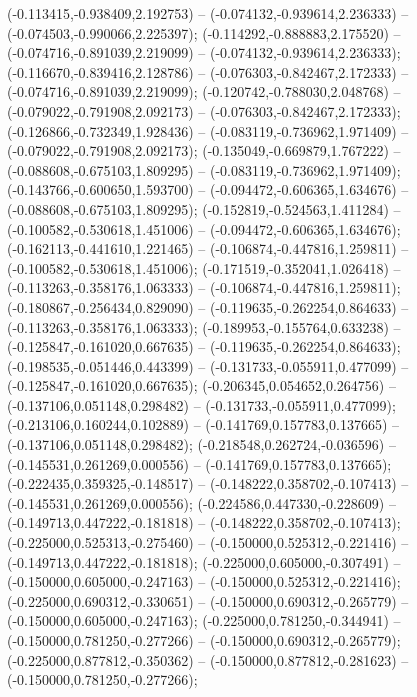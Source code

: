  (-0.113415,-0.938409,2.192753) -- (-0.074132,-0.939614,2.236333) -- (-0.074503,-0.990066,2.225397);
 (-0.114292,-0.888883,2.175520) -- (-0.074716,-0.891039,2.219099) -- (-0.074132,-0.939614,2.236333);
 (-0.116670,-0.839416,2.128786) -- (-0.076303,-0.842467,2.172333) -- (-0.074716,-0.891039,2.219099);
 (-0.120742,-0.788030,2.048768) -- (-0.079022,-0.791908,2.092173) -- (-0.076303,-0.842467,2.172333);
 (-0.126866,-0.732349,1.928436) -- (-0.083119,-0.736962,1.971409) -- (-0.079022,-0.791908,2.092173);
 (-0.135049,-0.669879,1.767222) -- (-0.088608,-0.675103,1.809295) -- (-0.083119,-0.736962,1.971409);
 (-0.143766,-0.600650,1.593700) -- (-0.094472,-0.606365,1.634676) -- (-0.088608,-0.675103,1.809295);
 (-0.152819,-0.524563,1.411284) -- (-0.100582,-0.530618,1.451006) -- (-0.094472,-0.606365,1.634676);
 (-0.162113,-0.441610,1.221465) -- (-0.106874,-0.447816,1.259811) -- (-0.100582,-0.530618,1.451006);
 (-0.171519,-0.352041,1.026418) -- (-0.113263,-0.358176,1.063333) -- (-0.106874,-0.447816,1.259811);
 (-0.180867,-0.256434,0.829090) -- (-0.119635,-0.262254,0.864633) -- (-0.113263,-0.358176,1.063333);
 (-0.189953,-0.155764,0.633238) -- (-0.125847,-0.161020,0.667635) -- (-0.119635,-0.262254,0.864633);
 (-0.198535,-0.051446,0.443399) -- (-0.131733,-0.055911,0.477099) -- (-0.125847,-0.161020,0.667635);
 (-0.206345,0.054652,0.264756) -- (-0.137106,0.051148,0.298482) -- (-0.131733,-0.055911,0.477099);
 (-0.213106,0.160244,0.102889) -- (-0.141769,0.157783,0.137665) -- (-0.137106,0.051148,0.298482);
 (-0.218548,0.262724,-0.036596) -- (-0.145531,0.261269,0.000556) -- (-0.141769,0.157783,0.137665);
 (-0.222435,0.359325,-0.148517) -- (-0.148222,0.358702,-0.107413) -- (-0.145531,0.261269,0.000556);
 (-0.224586,0.447330,-0.228609) -- (-0.149713,0.447222,-0.181818) -- (-0.148222,0.358702,-0.107413);
 (-0.225000,0.525313,-0.275460) -- (-0.150000,0.525312,-0.221416) -- (-0.149713,0.447222,-0.181818);
 (-0.225000,0.605000,-0.307491) -- (-0.150000,0.605000,-0.247163) -- (-0.150000,0.525312,-0.221416);
 (-0.225000,0.690312,-0.330651) -- (-0.150000,0.690312,-0.265779) -- (-0.150000,0.605000,-0.247163);
 (-0.225000,0.781250,-0.344941) -- (-0.150000,0.781250,-0.277266) -- (-0.150000,0.690312,-0.265779);
 (-0.225000,0.877812,-0.350362) -- (-0.150000,0.877812,-0.281623) -- (-0.150000,0.781250,-0.277266);
